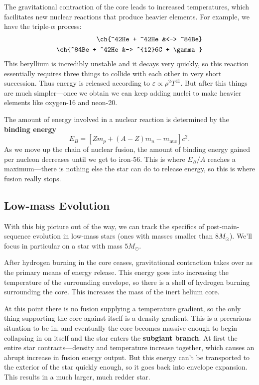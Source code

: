\documentclass[../a062main.tex]{subfiles}
\begin{document}
The gravitational contraction of the core leads to increased temperatures, which facilitates new nuclear reactions that produce heavier elements.
For example, we have the triple-$\alpha$ process:
\begin{align*}
    \ch{^42He + ^42He &<-> ^84Be} \\
    \ch{^84Be + ^42He &-> ^{12}6C + \gamma}
\end{align*}
This beryllium is incredibly unstable and it decays very quickly, so this reaction essentially requires three things to collide with each other in very short succession.
Thus energy is released according to $\varepsilon \propto \rho^2 T^{41}$.
But after this things are much simpler---once we obtain  we can keep adding  nuclei to make heavier elements like oxygen-16 and neon-20.

The amount of energy involved in a nuclear reaction is determined by the \textbf{binding energy}
\[ E_B = [Zm_p + (A - Z)m_n - m_\text{nuc}]c^2. \]
As we move up the chain of nuclear fusion, the amount of binding energy gained per nucleon decreases until we get to iron-56.
This is where $E_B / A$ reaches a maximum---there is nothing else the star can do to release energy, so this is where fusion really stops.

\subsection*{Low-mass Evolution}
With this big picture out of the way, we can track the specifics of post-main-sequence evolution in low-mass stars (ones with masses smaller than $8M_\odot$).
We'll focus in particular on a star with mass $5M_\odot$.

After hydrogen burning in the core ceases, gravitational contraction takes over as the primary means of energy release.
This energy goes into increasing the temperature of the surrounding envelope, so there is a shell of hydrogen burning surrounding the core.
This increases the mass of the inert helium core.

At this point there is no fusion supplying a temperature gradient, so the only thing supporting the core against itself is a density gradient.
This is a precarious situation to be in, and eventually the core becomes massive enough to begin collapsing in on itself and the star enters the \textbf{subgiant branch}.
At first the entire star contracts---density and temperature increase together, which causes an abrupt increase in fusion energy output.
But this energy can't be transported to the exterior of the star quickly enough, so it goes back into envelope expansion.
This results in a much larger, much redder star.
\end{document}
